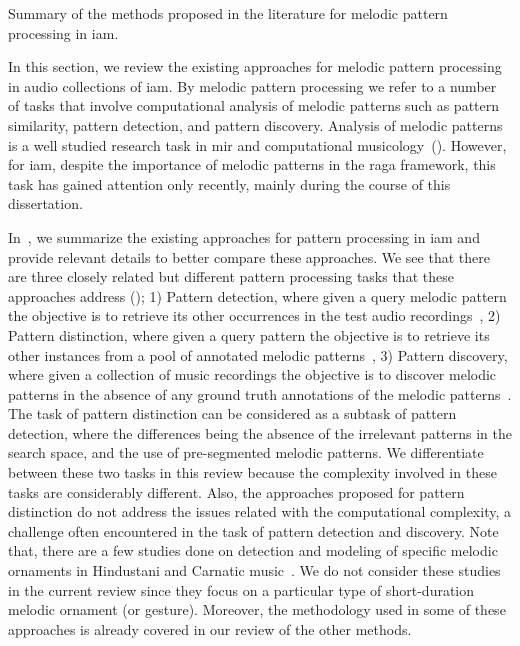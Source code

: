 \begin{table}
\begin{threeparttable}
\begin{tablenotes}
		\end{tablenotes}
		\caption[Summary of the melodic pattern processing methods for \gls{iam}]{Summary of the methods proposed in the literature for melodic pattern processing in \gls{iam}. }
		\label{tab:pattern_processing_iam}
	\end{threeparttable}
\end{table}

In this section, we review the existing approaches for melodic pattern processing in audio collections of \gls{iam}. By melodic pattern processing we refer to a number of tasks that involve computational analysis of melodic patterns such as pattern similarity, pattern detection, and pattern discovery. Analysis of melodic patterns is a well studied research task in \gls{mir} and computational musicology~(). However, for \gls{iam}, despite the importance of melodic patterns in the \gls{raga} framework, this task has gained attention only recently, mainly during the course of this dissertation. 

In~, we summarize the existing approaches for pattern processing in \gls{iam} and provide relevant details to better compare these approaches. We see that there are three closely related but different pattern processing tasks that these approaches address (); 1) Pattern detection, where given a query melodic pattern the objective is to retrieve its other occurrences in the test audio recordings~\citep{Ross2012,Ross2012b,Ishwar2013,dutta2014modified,ganguli2015efficient}, 2) Pattern distinction, where given a query pattern the objective is to retrieve its other instances from a pool of annotated melodic patterns~\citep{ishwar2012motivic,rao2013distinguishing,Rao2014}, 3) Pattern discovery, where given a collection of music recordings the objective is to discover melodic patterns in the absence of any ground truth annotations of the melodic patterns~\citep{Dutta2014}. The task of pattern distinction can be considered as a subtask of pattern detection, where the differences being the absence of the irrelevant patterns in the search space, and the use of pre-segmented melodic patterns. We differentiate between these two tasks in this review because the complexity involved in these tasks are considerably different. Also, the approaches proposed for pattern distinction do not address the issues related with the computational complexity, a challenge often encountered in the task of pattern detection and discovery. Note that, there are a few studies done on detection and modeling of specific melodic ornaments in Hindustani and Carnatic music~\citep{Subramanian2012,Datta2007,narayan2014detection,pratyush_2010}. We do not consider these studies in the current review since they focus on a particular type of short-duration melodic ornament (or gesture). Moreover, the methodology used in some of these approaches is already covered in our review of the other methods.

